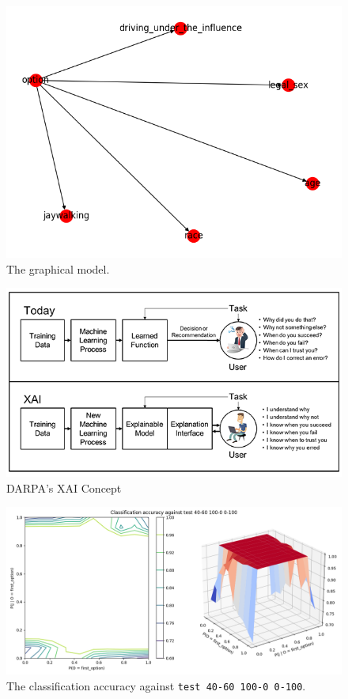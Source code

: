 \documentclass{report}
\newcommand{\code}{\texttt}
\begin{document}
\begin{figure}[h]
    \centering
    \includegraphics[scale=0.6]{figures/network.png}
    \caption[]{The graphical model.}
    \label{fig:graphical_model_image}
\end{figure}

\begin{figure}[h]
    \centering
    \includegraphics[scale=1.1]{figures/xai-figure2.png}
    \caption[]{DARPA's XAI Concept~\protect\cite[]{gunningXAIProgram}}
    \label{fig:darpa_xai}
\end{figure}

% 
% 

\begin{figure}[h]
    \centering
    \includegraphics[width=\textwidth]{test_40-60_100-0_0-100_accuracy.png}
    \caption[]{The classification accuracy against \code{test 40-60 100-0 0-100}.}
    \label{fig:test_40-60_100-0_0-100_accuracy_plot}
\end{figure}
\end{document}
